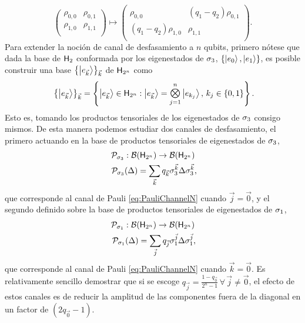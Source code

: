 \begin{equation}
    \begin{pmatrix}
        \rho_{0,0} & \rho_{0,1}\\
        \rho_{1,0} & \rho_{1,1}\\
    \end{pmatrix}\mapsto\begin{pmatrix}
        \rho_{0,0} & (q_{1}-q_{2})\rho_{0,1}\\
        (q_{1}-q_{2})\rho_{1,0} & \rho_{1,1}\\
    \end{pmatrix}.\nonumber
\end{equation}
Para extender la noción de canal de desfasamiento a $n$ qubits, primero nótese que dada la base de ${\sf H}_{2}$ conformada por los eigenestados de $\sigma_{3}$, $\{\ket{e_{0}},\ket{e_{1}}\}$, es posible construir una base $\left\{\ket{e_{\vec{k}}}\right\}_{\vec{k}}$ de ${\sf H}_{2^{n}}$ como
\begin{equation}
    \left\{\ket{e_{\vec{k}}}\right\}_{\vec{k}}=\left\{\ket{e_{\vec{k}}}\in\hilbert_{2^{n}}: \ket{e_{\vec{k}}}=\Motimes_{j=1}^{n}\ket{e_{k_{j}}},\,k_{j}\in\{0,1\}\right\} \rlap{.}\nonumber
\end{equation}
Esto es, tomando los productos tensoriales de los eigenestados de $\sigma_{3}$ consigo mismos. De esta manera podemos estudiar dos canales de desfasamiento, el primero actuando en la base de productos tensoriales de eigenestados de $\sigma_{3}$,
\begin{gather}
    \mcP_{\pauli{3}}:\mcB(\hilbert_{2^{n}}) \rightarrow \mcB(\hilbert_{2^{n}})\nonumber\\
    \mcP_{\pauli{3}}(\Delta)=\sum_{\vec{k}}q_{\vec{k}}\pauli{3}^{\vec{k}}\Delta\pauli{3}^{\vec{k}}\rlap{,}\nonumber
\end{gather}
que corresponde al canal de Pauli \ref{eq:PauliChannelN} cuando $\vec{j}=\vec{0}$, y el segundo definido sobre la base de productos tensoriales de eigenestados de $\sigma_{1}$,
\begin{gather}
    \mcP_{\pauli{1}}:\mcB(\hilbert_{2^{n}}) \rightarrow \mcB(\hilbert_{2^{n}})\nonumber\\
    \mcP_{\pauli{1}}(\Delta)=\sum_{\vec{j}}q_{\vec{j}}\pauli{1}^{\vec{j}}\Delta\pauli{1}^{\vec{j}}\rlap{,}\nonumber
\end{gather}
que corresponde al canal de Pauli \ref{eq:PauliChannelN} cuando $\vec{k}=\vec{0}$. Es relativamente sencillo demostrar que si se escoge $q_{\vec{j}}=\frac{1-q_{\vec{0}}}{2^{n}-1}\,\forall\,\vec{j}\neq\vec{0}$, el efecto de estos canales es de reducir la amplitud de las componentes fuera de la diagonal en un factor de $(2q_{\vec{0}}-1)$.  

